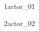 \parbox[t]{4.75in}{1\hfil\break actor\_01}\hfil\break\vskip 0.25in
\parbox[t]{4.75in}{2\hfil\break actor\_02}\hfil\break\vskip 0.25in
